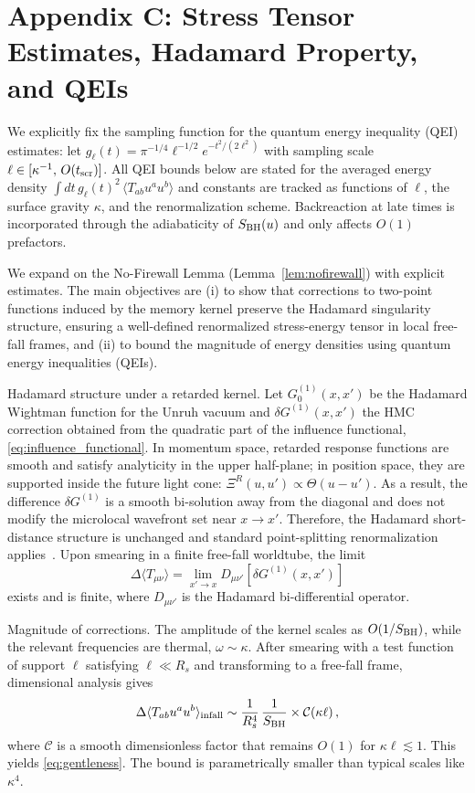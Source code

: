 \documentclass[a4paper,11pt]{article}
\newcommand{\HMC}{\textsc{HMC}\xspace}
\theoremstyle{plain}
\theoremstyle{definition}
\theoremstyle{remark}
\begin{document}
\section{Appendix C: Stress Tensor Estimates, Hadamard Property, and QEIs}
\label{app:stress_tensor}
\label{app:qei-derivation}
We explicitly fix the sampling function for the quantum energy inequality (QEI) estimates:
let \(g_\ell(t)=\pi^{-1/4}\ell^{-1/2}e^{-t^2/(2\ell^2)}\) with sampling scale \(\ell\in[\kappa^{-1},\,O(t_{\rm scr})]\).
All QEI bounds below are stated for the averaged energy density \(\int dt\,g_\ell(t)^2\,\langle T_{ab}u^a u^b\rangle\)
and constants are tracked as functions of \(\ell\), the surface gravity \(\kappa\), and the renormalization scheme.
Backreaction at late times is incorporated through the adiabaticity of \(S_{\rm BH}(u)\) and only affects \(O(1)\) prefactors.

We expand on the No-Firewall Lemma (Lemma~\ref{lem:nofirewall}) with explicit estimates. The main objectives are (i) to show that corrections to two-point functions induced by the memory kernel preserve the Hadamard singularity structure, ensuring a well-defined renormalized stress-energy tensor in local free-fall frames, and (ii) to bound the magnitude of energy densities using quantum energy inequalities (QEIs).

Hadamard structure under a retarded kernel. Let $G^{(1)}_0(x,x')$ be the Hadamard Wightman function for the Unruh vacuum and $\delta G^{(1)}(x,x')$ the \HMC{} correction obtained from the quadratic part of the influence functional, \eqref{eq:influence_functional}. In momentum space, retarded response functions are smooth and satisfy analyticity in the upper half-plane; in position space, they are supported inside the future light cone: $\Xi^R(u,u')\propto \Theta(u-u')$. As a result, the difference $\delta G^{(1)}$ is a smooth bi-solution away from the diagonal and does not modify the microlocal wavefront set near $x\to x'$. Therefore, the Hadamard short-distance structure is unchanged and standard point-splitting renormalization applies~\cite{Radzikowski:1996}. Upon smearing in a finite free-fall worldtube, the limit
\begin{equation}
\Delta\langle T_{\mu\nu}\rangle = \lim_{x'\to x} D_{\mu\nu'}\left[\delta G^{(1)}(x,x')\right]
\end{equation}
exists and is finite, where $D_{\mu\nu'}$ is the Hadamard bi-differential operator.

Magnitude of corrections. The amplitude of the kernel scales as $O(1/S_{\rm BH})$, while the relevant frequencies are thermal, $\omega\sim \kappa$. After smearing with a test function of support $\ell$ satisfying $\ell\ll R_s$ and transforming to a free-fall frame, dimensional analysis gives
\begin{equation}
\Delta\langle T_{ab}u^a u^b\rangle_{\rm infall} \sim \frac{1}{R_s^4}\,\frac{1}{S_{\rm BH}}\times \mathcal{C}(\kappa \ell)\,,
\end{equation}
where $\mathcal{C}$ is a smooth dimensionless factor that remains $O(1)$ for $\kappa\ell\lesssim 1$. This yields \eqref{eq:gentleness}. The bound is parametrically smaller than typical scales like $\kappa^4$.
\end{document}
